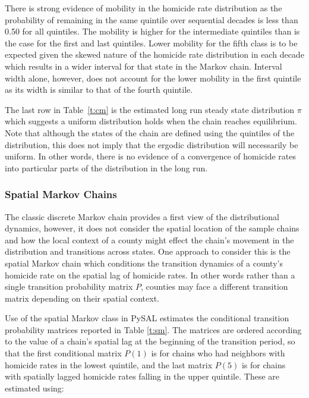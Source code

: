 \documentclass[11pt, titlepage]{article}
\begin{document}
There is strong evidence of mobility in the homicide rate distribution
as the probability of remaining in the same quintile over sequential
decades is less than 0.50 for all quintiles. The mobility is higher for
the intermediate quintiles than is the case for the first and last
quintiles. Lower mobility for the fifth class is to be expected given
the skewed nature of the homicide rate distribution in each decade which
results in a wider interval for that state in the Markov chain. Interval
width alone, however, does not account for the lower mobility in the
first quintile as its width is similar to that of the fourth quintile.

The last row in Table~\ref{t:cm} is the estimated long run steady state
distribution $\pi$ which suggests a uniform distribution holds when the chain
reaches equilibrium. Note that although the states of the chain are
defined using the quintiles of the distribution, this does not imply
that the ergodic distribution will necessarily be uniform. In other
words, there is no evidence of a convergence of homicide rates into
particular parts of the distribution in the long run.

\subsubsection{Spatial Markov Chains}

The classic discrete Markov chain provides a first view of the
distributional dynamics, however, it does not consider the spatial
location of the sample chains and how the local context of a county
might effect the chain's movement in the distribution and transitions
across states. One approach to consider this is the spatial Markov chain
which conditions the transition dynamics of a county's homicide rate on
the spatial lag of homicide rates. In other words rather than a single
transition probability matrix $P$, counties may face a different
transition matrix depending on their spatial context.

Use of the spatial Markov class in PySAL estimates the conditional
transition probability matrices reported in Table \ref{t:sm}. The matrices are
ordered according to the value of a chain's spatial lag at the beginning
of the transition period, so that the first conditional matrix $P(1)$ is
for chains who had neighbors with homicide rates in the lowest quintile,
and the last matrix $P(5)$ is for chains with spatially lagged homicide
rates falling in the upper quintile. These are estimated using:
\end{document}
